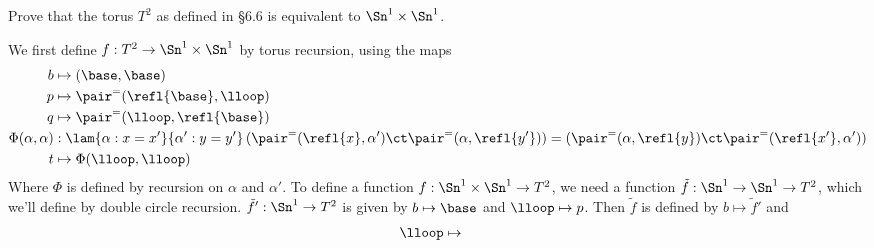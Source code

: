 \begin{coqdoccode}
\coqdocemptyline
\end{coqdoccode}
Prove that the torus $T^{2}$ as defined in \S6.6 
is equivalent to $\Sn^{1} \times \Sn^{1}$.


 \soln
We first define $f : T^{2} \to \Sn^{1} \times \Sn^{1}$ by torus recursion,
using the maps
\begin{align*}
  b &\mapsto (\base, \base) \\
  p &\mapsto \pair^{=}(\refl{\base}, \lloop)\\
  q &\mapsto \pair^{=}(\lloop, \refl{\base})\\
  \Phi(\alpha, \alpha) &: \lam{\alpha : x = x'}{\alpha' : y = y'}
    \left(\pair^{=}(\refl{x}, \alpha') \ct \pair^{=}(\alpha, \refl{y'})\right)
    =
    \left(\pair^{=}(\alpha, \refl{y}) \ct \pair^{=}(\refl{x'}, \alpha')\right) \\
  t &\mapsto \Phi(\lloop, \lloop)
\end{align*}
Where $\Phi$ is defined by recursion on $\alpha$ and $\alpha'$.  To define a
function $f : \Sn^{1} \times \Sn^{1} \to T^{2}$, we need a function $\tilde{f}
: \Sn^{1} \to \Sn^{1} \to T^{2}$, which we'll define by double circle
recursion.  $\tilde{f}' : \Sn^{1} \to T^{2}$ is given by $b \mapsto \base$ and
$\lloop \mapsto p$.  Then $\tilde{f}$ is defined by $b \mapsto \tilde{f}'$ and
\begin{align*}
  \lloop &\mapsto 
\end{align*}
